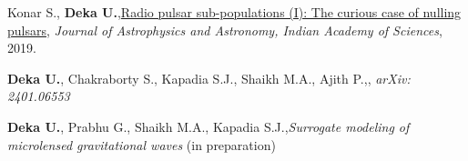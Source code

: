 \begin{itemize}[noitemsep]
{
\item Konar S., \textbf{Deka U.},\href{https://www.ias.ac.in/article/fulltext/joaa/040/05/0042}{Radio pulsar sub-populations (I): The curious case of nulling pulsars}, \textit{Journal of Astrophysics and Astronomy, Indian Academy of Sciences}, 2019.
}\end{itemize}

\begin{itemize}[noitemsep]
{
\item \textbf{Deka U.}, Chakraborty S., Kapadia S.J., Shaikh M.A., Ajith P.,, \textit{arXiv: 2401.06553}
}\end{itemize}

\begin{itemize}[noitemsep]
{
\item \textbf{Deka U.}, Prabhu G., Shaikh M.A., Kapadia S.J.,\textit{Surrogate modeling of microlensed gravitational waves} (in preparation)
}\end{itemize}